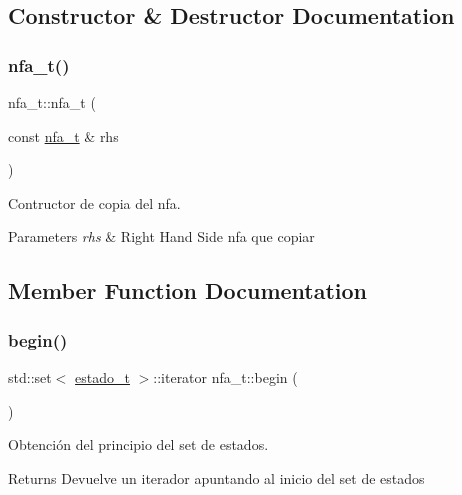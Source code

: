 \subsection{Constructor \& Destructor Documentation}
\mbox{\label{classnfa__t_a1932cce0cf1d97f208a28970853b5c5d}} 
\subsubsection{\texorpdfstring{nfa\+\_\+t()}{nfa\_t()}}
{\footnotesize\ttfamily nfa\+\_\+t\+::nfa\+\_\+t (\begin{DoxyParamCaption}\item[{const \hyperlink{classnfa__t}{nfa\+\_\+t} \&}]{rhs }\end{DoxyParamCaption})}



Contructor de copia del nfa. 


\begin{DoxyParams}{Parameters}
{\em rhs} & Right Hand Side nfa que copiar \\
\hline
\end{DoxyParams}


\subsection{Member Function Documentation}
\mbox{\label{classnfa__t_a60b8e4a7aab7e52c68dae1c4373f6b13}} 
\subsubsection{\texorpdfstring{begin()}{begin()}}
{\footnotesize\ttfamily std\+::set$<$ \hyperlink{classestado__t}{estado\+\_\+t} $>$\+::iterator nfa\+\_\+t\+::begin (\begin{DoxyParamCaption}{ }\end{DoxyParamCaption})}



Obtención del principio del set de estados. 

\begin{DoxyReturn}{Returns}
Devuelve un iterador apuntando al inicio del set de estados 
\end{DoxyReturn}
\mbox{\label{classnfa__t_a299fb32d9a64a117fd770b7b80ccf1cb}} 
